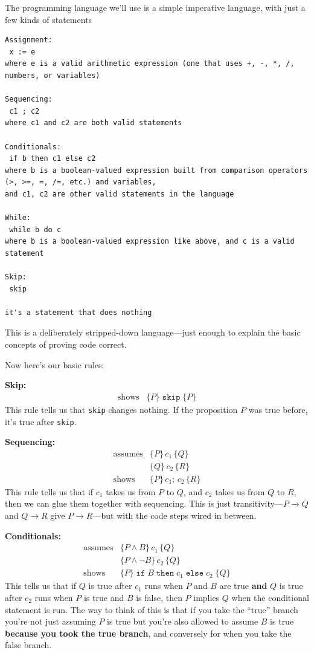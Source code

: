 \documentclass[11pt]{article}
\begin{document}
The programming language we'll use is a simple imperative language, with just a few kinds of statements

\begin{lstlisting}
Assignment:
 x := e
where e is a valid arithmetic expression (one that uses +, -, *, /, numbers, or variables)

Sequencing:
 c1 ; c2
where c1 and c2 are both valid statements

Conditionals:
 if b then c1 else c2
where b is a boolean-valued expression built from comparison operators (>, >=, =, /=, etc.) and variables,
and c1, c2 are other valid statements in the language

While:
 while b do c
where b is a boolean-valued expression like above, and c is a valid statement

Skip:
 skip

it's a statement that does nothing
\end{lstlisting}
This is a deliberately stripped-down language---just enough to explain the basic concepts of proving code correct.

Now here's our basic rules:

\noindent\textbf{Skip:}
\[
  \begin{array}{rl}
    \hline
    \text{shows} & \{P\}\; \texttt{skip}\; \{P\}
  \end{array}
\]
This rule tells us that \texttt{skip} changes nothing. If the proposition $P$ was true before, it's true after \texttt{skip}.

\noindent\textbf{Sequencing:}
\[
  \begin{array}{rl}
    \text{assumes} & \{P\}\, c_1\, \{Q\} \\
                   & \{Q\}\, c_2\, \{R\} \\
    \hline
    \text{shows} & \{P\}\, c_1;\, c_2\, \{R\}
  \end{array}
\]
This rule tells us that if $c_1$ takes us from $P$ to $Q$, and $c_2$ takes us from $Q$ to $R$, then we can glue them together with sequencing. This is just transitivity---$P \to Q$ and $Q \to R$ give $P \to R$---but with the code steps wired in between.

\noindent\textbf{Conditionals:}
\[
  \begin{array}{rl}
    \text{assumes} & \{P \wedge B\}\, c_1\, \{Q\} \\
                   & \{P \wedge \lnot B\}\, c_2\, \{Q\} \\
    \hline
    \text{shows} & \{P\}\; \texttt{if}\; B\; \texttt{then}\; c_1\; \texttt{else}\; c_2\; \{Q\}
  \end{array}
\]
This tells us that if $Q$ is true after $c_1$ runs when $P$ and $B$ are true \textbf{and} $Q$ is true after $c_2$ runs when $P$ is true and $B$ is false, then $P$ implies $Q$ when the conditional statement is run. The way to think of this is that if you take the ``true'' branch you're not just assuming $P$ is true but you're also allowed to assume $B$ is true \textbf{because you took the true branch}, and conversely for when you take the false branch.
\end{document}
